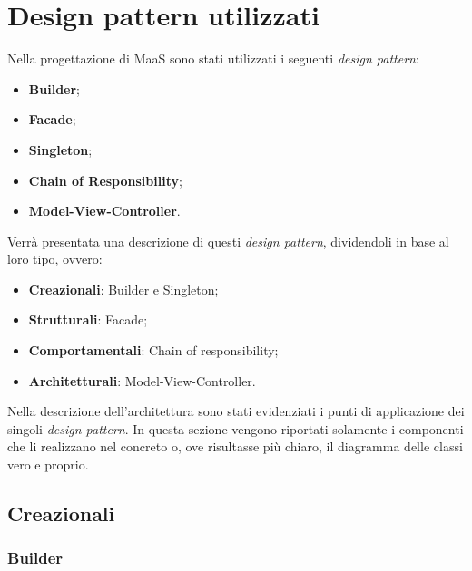 \newpage
\section{Design pattern utilizzati}
Nella progettazione di MaaS sono stati utilizzati i seguenti \textit{design pattern}:
\begin{itemize}
\item \textbf{Builder};
\item \textbf{Facade};
\item \textbf{Singleton};
\item \textbf{Chain of Responsibility};
\item \textbf{Model-View-Controller}.
\end{itemize}
Verrà presentata una descrizione di questi \textit{design pattern}, dividendoli in base al loro tipo, ovvero:
\begin{itemize}
\item \textbf{Creazionali}: Builder e Singleton;
\item \textbf{Strutturali}: Facade;
\item \textbf{Comportamentali}: Chain of responsibility;
\item \textbf{Architetturali}: Model-View-Controller.
\end{itemize}
Nella descrizione dell'architettura sono stati evidenziati i punti di applicazione dei singoli \textit{design pattern}. In questa sezione vengono riportati solamente i componenti che li realizzano nel concreto o, ove risultasse più chiaro, il diagramma delle classi vero e proprio.
\subsection{Creazionali}
\subsubsection{Builder}
